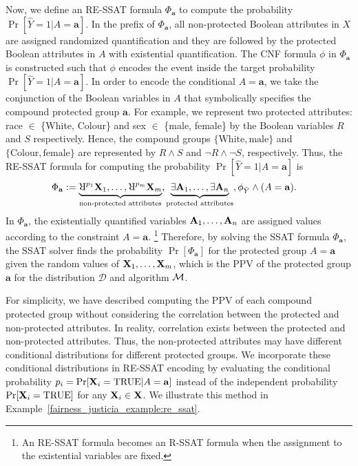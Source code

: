 Now, we define an RE-SSAT formula $\Phi_{\mathbf{a}}$ to compute the probability $\Pr[\hat{Y} = 1 | A = \mathbf{a}]$. In the prefix of $ \Phi_{\mathbf{a}} $,  all non-protected Boolean attributes in $X$ are assigned randomized quantification and they are followed by the protected Boolean attributes in $ A $ with existential quantification. The CNF formula $ \phi $ in $ \Phi_{\mathbf{a}} $ is constructed such that $ \phi $ encodes the event inside the target probability $ \Pr[\hat{Y} = 1 | A = \mathbf{a}] $. In order to encode the conditional $ A = \mathbf{a} $, we take the conjunction of the Boolean variables in $ A $ that symbolically specifies the compound protected group $ \mathbf{a} $. For example, we represent two protected attributes: race $ \in $ \{White, Colour\} and sex $ \in $ \{male, female\} by the Boolean variables $ R $ and $ S $  respectively. Hence, the compound groups $\{\textrm{White}, \textrm{male}\}$ and $\{\textrm{Colour}, \textrm{female}\}$ are represented by $ R \wedge S $ and $ \neg R \wedge \neg S $, respectively. Thus, the RE-SSAT formula for computing the probability  $ \Pr[\hat{Y} = 1 | A = \mathbf{a}] $ is
\begin{equation}	\label{fairness_justicia_eq:re}
\begin{split}
	\Phi_{\mathbf{a}} := \underbrace{\R^{p_{1}}\nonsensitive_1, \dots, \R^{p_{m}}\nonsensitive_m}_{\text{non-protected attributes}},  &\underbrace{\exists \sensitive_1,\dots, \exists \sensitive_n}_{\text{protected attributes}},
\phi_{\hat{Y}} \wedge (A=\mathbf{a}).\notag
\end{split}
\end{equation}
In $ \Phi_{\mathbf{a}} $, the existentially quantified variables $ \mathbf{A}_1, \dots, \mathbf{A}_n $ are assigned values  according  to the constraint $ A=\mathbf{a} $. \footnote{An RE-SSAT formula becomes an R-SSAT formula when the assignment to the existential variables are fixed.} Therefore, by solving the SSAT formula $ \Phi_{\mathbf{a}} $,  the SSAT solver finds the probability $ \Pr[\Phi_{\mathbf{a}}] $ for the protected group $ A=\mathbf{a} $ given the random values of $ \mathbf{X}_1, \dots, \mathbf{X}_m $, which is the PPV of the protected group $\mathbf{a} $ for the distribution $ \mathcal{D} $ and algorithm $\mathcal{M}$. 

For simplicity, we have described computing the PPV of each compound protected group without considering the correlation between the protected and non-protected attributes. In reality, correlation exists between the protected and non-protected attributes. Thus, the non-protected attributes may have different conditional distributions for different protected groups. We incorporate these conditional distributions in RE-SSAT encoding by evaluating the conditional probability $ p_i = \Pr[\mathbf{X}_i =\text{TRUE}| A=\mathbf{a}] $ instead of the independent probability $\Pr[\mathbf{X}_i =\text{TRUE}]$ for any $\mathbf{X}_i\in \mathbf{X}$. We illustrate this method in Example~\ref{fairness_justicia_example:re_ssat}.

